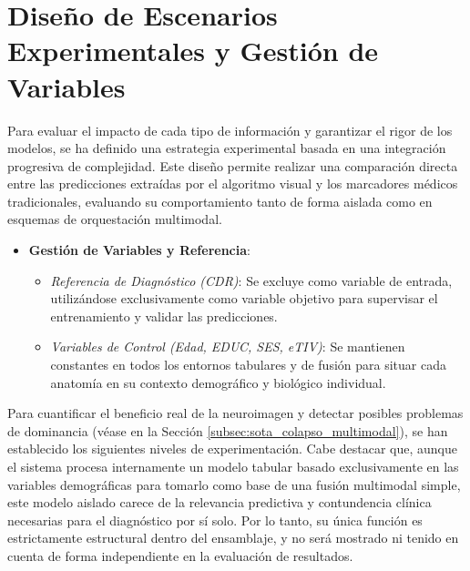 \documentclass[12pt, oneside, english, spanish]{book}
\begin{document}


\section{Diseño de Escenarios Experimentales y Gestión de Variables} \label{sec:diseno_escenarios}

Para evaluar el impacto de cada tipo de información y garantizar el rigor de los modelos, se ha definido una estrategia experimental basada en una integración progresiva de complejidad. Este diseño permite realizar una comparación directa entre las predicciones extraídas por el algoritmo visual y los marcadores médicos tradicionales, evaluando su comportamiento tanto de forma aislada como en esquemas de orquestación multimodal.

\begin{itemize}
	
	\item \textbf{Gestión de Variables y Referencia}:
	
	\begin{itemize}
		
		\item \textit{Referencia de Diagnóstico (CDR)}: Se excluye como variable de entrada, utilizándose exclusivamente como variable objetivo para supervisar el entrenamiento y validar las predicciones.
		
		\item \textit{Variables de Control (Edad, EDUC, SES, eTIV)}: Se mantienen constantes en todos los entornos tabulares y de fusión para situar cada anatomía en su contexto demográfico y biológico individual.
		
	\end{itemize}
	
\end{itemize}

Para cuantificar el beneficio real de la neuroimagen y detectar posibles problemas de dominancia (véase en la Sección \ref{subsec:sota_colapso_multimodal}), se han establecido los siguientes niveles de experimentación. Cabe destacar que, aunque el sistema procesa internamente un modelo tabular basado exclusivamente en las variables demográficas para tomarlo como base de una fusión multimodal simple, este modelo aislado carece de la relevancia predictiva y contundencia clínica necesarias para el diagnóstico por sí solo. Por lo tanto, su única función es estrictamente estructural dentro del ensamblaje, y no será mostrado ni tenido en cuenta de forma independiente en la evaluación de resultados.
\end{document}
